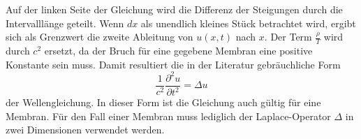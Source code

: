Auf der linken Seite der Gleichung wird die Differenz der Steigungen durch die Intervalllänge geteilt.
Wenn $ dx $ als unendlich kleines Stück betrachtet wird, ergibt sich als Grenzwert die zweite Ableitung von $ u(x,t) $ nach $ x $. 
Der Term $ \frac{\rho}{T} $ wird durch $ c^2 $ ersetzt, da der Bruch für eine gegebene Membran eine positive Konstante sein muss. 
Damit resultiert die in der Literatur gebräuchliche Form 
\begin{equation}
	\label{kreismembran:Ausgang_DGL}
	\frac{1}{c^2}\frac{\partial^2u}{\partial t^2} = \Delta u
\end{equation}
der Wellengleichung.
In dieser Form ist die Gleichung auch gültig für eine Membran. 
Für den Fall einer Membran muss lediglich der Laplace-Operator $\Delta$ in zwei Dimensionen verwendet werden.
%

